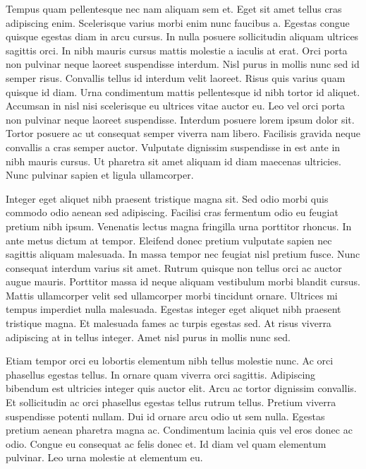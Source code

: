 \documentclass[11pt,a4paper]{article}
\begin{document}
Tempus quam pellentesque nec nam aliquam sem et. Eget sit amet tellus cras adipiscing enim. Scelerisque varius morbi enim nunc faucibus a. Egestas congue quisque egestas diam in arcu cursus. In nulla posuere sollicitudin aliquam ultrices sagittis orci. In nibh mauris cursus mattis molestie a iaculis at erat. Orci porta non pulvinar neque laoreet suspendisse interdum. Nisl purus in mollis nunc sed id semper risus. Convallis tellus id interdum velit laoreet. Risus quis varius quam quisque id diam. Urna condimentum mattis pellentesque id nibh tortor id aliquet. Accumsan in nisl nisi scelerisque eu ultrices vitae auctor eu. Leo vel orci porta non pulvinar neque laoreet suspendisse. Interdum posuere lorem ipsum dolor sit. Tortor posuere ac ut consequat semper viverra nam libero. Facilisis gravida neque convallis a cras semper auctor. Vulputate dignissim suspendisse in est ante in nibh mauris cursus. Ut pharetra sit amet aliquam id diam maecenas ultricies. Nunc pulvinar sapien et ligula ullamcorper.

Integer eget aliquet nibh praesent tristique magna sit. Sed odio morbi quis commodo odio aenean sed adipiscing. Facilisi cras fermentum odio eu feugiat pretium nibh ipsum. Venenatis lectus magna fringilla urna porttitor rhoncus. In ante metus dictum at tempor. Eleifend donec pretium vulputate sapien nec sagittis aliquam malesuada. In massa tempor nec feugiat nisl pretium fusce. Nunc consequat interdum varius sit amet. Rutrum quisque non tellus orci ac auctor augue mauris. Porttitor massa id neque aliquam vestibulum morbi blandit cursus. Mattis ullamcorper velit sed ullamcorper morbi tincidunt ornare. Ultrices mi tempus imperdiet nulla malesuada. Egestas integer eget aliquet nibh praesent tristique magna. Et malesuada fames ac turpis egestas sed. At risus viverra adipiscing at in tellus integer. Amet nisl purus in mollis nunc sed.

Etiam tempor orci eu lobortis elementum nibh tellus molestie nunc. Ac orci phasellus egestas tellus. In ornare quam viverra orci sagittis. Adipiscing bibendum est ultricies integer quis auctor elit. Arcu ac tortor dignissim convallis. Et sollicitudin ac orci phasellus egestas tellus rutrum tellus. Pretium viverra suspendisse potenti nullam. Dui id ornare arcu odio ut sem nulla. Egestas pretium aenean pharetra magna ac. Condimentum lacinia quis vel eros donec ac odio. Congue eu consequat ac felis donec et. Id diam vel quam elementum pulvinar. Leo urna molestie at elementum eu.
\end{document}
